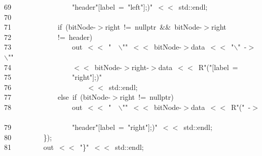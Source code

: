 \documentclass[11pt,a4paper]{ctexart}
\newcommand{\hlstd}[1]{\textcolor[rgb]{0.2,0.2,0.2}{#1}}
\newcommand{\hlesc}[1]{\textcolor[rgb]{0.86,0.41,0.09}{#1}}
\newcommand{\hlstr}[1]{\textcolor[rgb]{0.06,0.58,0.63}{#1}}
\newcommand{\hlopt}[1]{\textcolor[rgb]{0.2,0.2,0.2}{#1}}
\newcommand{\hllin}[1]{\textcolor[rgb]{0.59,0.59,0.59}{#1}}
\newcommand{\hlkwa}[1]{\textcolor[rgb]{0.23,0.42,0.78}{#1}}
\newcommand{\hlkwc}[1]{\textcolor[rgb]{0,0.63,0.31}{#1}}
\begin{document}
\hllin{69\ }\hlstr{}\hlstd{\ \ \ \ \ \ \ \ \ \ \ \ \ \ \ \ }\hlstr{"}\hlstd{header}\hlstr{"{[}label\ =\ "}\hlstd{left}\hlstr{"{]};)"}\hlstd{\ }\hlopt{$<$$<$\ }\hlstd{}\hlkwc{std}\hlstd{}\hlopt{::}\hlstd{endl}\hlopt{;}\\
\hllin{70\ }\hlstd{}\\
\hllin{71\ }\hlstd{}\hlstd{\ \ \ \ \ \ \ \ \ \ \ \ }\hlstd{}\hlkwa{if\ }\hlstd{}\hlopt{(}\hlstd{bitNode}\hlopt{{-}$>$}\hlstd{right\ }\hlopt{!=\ }\hlstd{}\hlkwc{nullptr\ }\hlstd{}\hlopt{\&\&\ }\hlstd{bitNode}\hlopt{{-}$>$}\hlstd{right\ }\Righttorque\\
\hllin{72\ }\hlstd{}\hlstd{\ \ \ \ \ \ \ \ \ \ \ \ }\hlstd{}\hlopt{!=\ }\hlstd{header}\hlopt{)}\\
\hllin{73\ }\hlstd{}\hlstd{\ \ \ \ \ \ \ \ \ \ \ \ \ \ \ \ }\hlstd{out\ }\hlopt{$<$$<$\ }\hlstd{}\hlstr{"}\hlstd{\ \ }\hlstr{}\hlesc{$\backslash$"}\hlstr{"}\hlstd{\ }\hlopt{$<$$<$\ }\hlstd{bitNode}\hlopt{{-}$>$}\hlstd{data\ }\hlopt{$<$$<$\ }\hlstd{}\hlstr{"}\hlesc{$\backslash$"\ }\hlstr{{-}$>$\ }\hlesc{$\backslash$"}\hlstr{"}\hlstd{\ }\Righttorque\\
\hllin{74\ }\hlstd{}\hlstd{\ \ \ \ \ \ \ \ \ \ \ \ \ \ \ \ }\hlstd{}\hlopt{$<$$<$\ }\hlstd{bitNode}\hlopt{{-}$>$}\hlstd{right}\hlopt{{-}$>$}\hlstd{data\ }\hlopt{$<$$<$\ }\hlstd{R}\hlstr{"("}\hlstd{}\hlopt{{[}}\hlstd{label\ }\hlopt{=\ }\Righttorque\\
\hllin{75\ }\hlstd{}\hlstd{\ \ \ \ \ \ \ \ \ \ \ \ \ \ \ \ }\hlstd{}\hlstr{"right"}\hlstd{}\hlopt{{]};)}\hlstd{}\hlstr{"}\\
\hllin{76\ }\hlstr{}\hlstd{\ \ \ \ \ \ \ \ \ \ \ \ \ \ \ \ \ \ \ \ }\hlstr{$<$$<$\ std::endl;}\\
\hllin{77\ }\hlstr{}\hlstd{\ \ \ \ \ \ \ \ \ \ \ \ }\hlstr{else\ if\ (bitNode{-}$>$right\ !=\ nullptr)}\\
\hllin{78\ }\hlstr{}\hlstd{\ \ \ \ \ \ \ \ \ \ \ \ \ \ \ \ }\hlstr{out\ $<$$<$\ "}\hlstd{}\hlstd{\ \ }\hlstd{}\hlesc{$\backslash$"}\hlstd{}\hlstr{"\ $<$$<$\ bitNode{-}$>$data\ $<$$<$\ R"}\hlstd{}\hlopt{(}\hlstd{}\hlstr{"\ {-}$>$\ }\Righttorque\\
\hllin{79\ }\hlstr{}\hlstd{\ \ \ \ \ \ \ \ \ \ \ \ \ \ \ \ }\hlstr{"}\hlstd{header}\hlstr{"{[}label\ =\ "}\hlstd{right}\hlstr{"{]};)"}\hlstd{\ }\hlopt{$<$$<$\ }\hlstd{}\hlkwc{std}\hlstd{}\hlopt{::}\hlstd{endl}\hlopt{;}\\
\hllin{80\ }\hlstd{}\hlstd{\ \ \ \ \ \ \ \ }\hlstd{}\hlopt{\});}\\
\hllin{81\ }\hlstd{}\hlstd{\ \ \ \ \ \ \ \ }\hlstd{out\ }\hlopt{$<$$<$\ }\hlstd{}\hlstr{"\}"}\hlstd{\ }\hlopt{$<$$<$\ }\hlstd{}\hlkwc{std}\hlstd{}\hlopt{::}\hlstd{endl}\hlopt{;}\\
\end{document}
